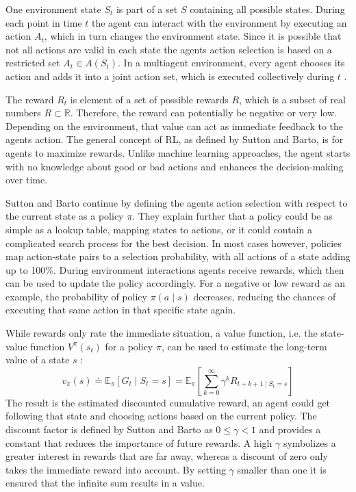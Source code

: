 One environment state $S_t$ is part of a set $S$ containing all possible states. During each point in time $t$ the agent can interact with the environment by executing an action $A_t$, which in turn changes the environment state. Since it is possible that not all actions are valid in each state the agents action selection is based on a restricted set $A_t\in A(S_t)$. In a multiagent environment, every agent chooses its action and adds it into a joint action set, which is executed collectively during $t$ \cite{buba10}.

The reward $R_t$ is element of a set of possible rewards $R$, which is a subset of real numbers $R \subset \mathbb{R}$. Therefore, the reward can potentially be negative or very low. Depending on the environment, that value can act as immediate feedback to the agents action. The general concept of RL, as defined by Sutton and Barto, is for agents to maximize rewards. Unlike machine learning approaches, the agent starts with no knowledge about good or bad actions and enhances the decision-making over time.

Sutton and Barto continue by defining the agents action selection with respect to the current state as a policy $\pi$. They explain further that a policy could be as simple as a lookup table, mapping states to actions, or it could contain a complicated search process for the best decision.
In most cases however, policies map action-state pairs to a selection probability, with all actions of a state adding up to 100\%.
During environment interactions agents receive rewards, which then can be used to update the policy accordingly. For a negative or low reward as an example, the probability of policy $\pi(a \mid s)$ decreases, reducing the chances of executing that same action in that specific state again.

While rewards only rate the immediate situation, a value function, i.e. the state-value function $V^\pi(s_t)$ for a policy $\pi$, can be used to estimate the long-term value of a state $s$ \cite{suba18}:
\begin{equation}\label{eq:value_func}
    v_\pi(s) \doteq \mathbb{E}_\pi \left[ G_t \mid S_t = s \right] = \mathbb{E}_\pi \left[ \sum^{\infty}_{k=0} \gamma^k R_{t+k+1 \mid S_t = s}  \right]
\end{equation}
The result is the estimated discounted cumulative reward, an agent could get following that state and choosing actions based on the current policy. The discount factor is defined by Sutton and Barto as $0 \le \gamma < 1$ and provides a constant that reduces the importance of future rewards. A high $\gamma$ symbolizes a greater interest in rewards that are far away, whereas a discount of zero only takes the immediate reward into account. By setting $\gamma$ smaller than one it is ensured that the infinite sum results in a value.


